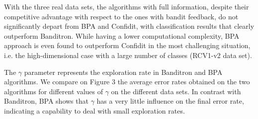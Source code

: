 With the three real data sets, the algorithms with full information, despite their competitive advantage with respect to the ones with bandit feedback, do not significantly depart from BPA and Confidit, with classification results that clearly outperform Banditron. While having a lower computational complexity, BPA approach is even found to outperform Confidit in the most challenging situation, i.e. the high-dimensional case with a large number of classes (RCV1-v2 data set).

The $\gamma$ parameter represents the exploration rate in Banditron and BPA algorithms. We compare on Figure 3 the average error rates obtained on the two algorithms for different values of $\gamma$ on the different data sets. In contrast with Banditron, BPA shows that $\gamma$ has a very little influence on the final error rate, indicating a capability to deal with small exploration rates.


